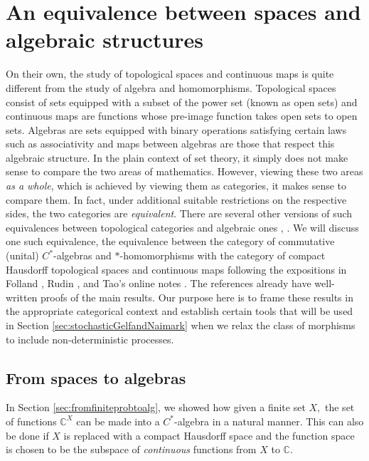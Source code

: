 \documentclass[12pt]{article}
\theoremstyle{theorem}
\theoremstyle{definition}
\numberwithin{equation}{section}
\let\C=\Chi \let\W=\Omega
\newcommand{\<}{\langle}
\renewcommand{\>}{\rangle}
\def\C{{{\mathbb C}}}
\begin{document}
\section{An equivalence between spaces and algebraic structures}
\label{sec:GelfandNaimark}

On their own, the study of topological spaces and continuous maps
is quite different from the study of algebra and homomorphisms.
Topological spaces consist
of sets equipped with a subset of the power set (known as open sets) 
and continuous maps
are functions whose pre-image function takes open sets to open sets. 
Algebras are sets equipped with binary operations satisfying certain
laws such as associativity and maps between algebras are those 
that respect this algebraic structure. 
In the plain context of set theory, it simply does not make sense to compare
the two areas of mathematics. However, viewing these two areas 
\emph{as a whole}, which is achieved by viewing them as categories, 
it makes sense to compare them. 
In fact, under additional suitable restrictions on the respective sides, 
the two categories are \emph{equivalent}. 
There are several other versions of such equivalences between
topological categories and algebraic ones \cite{Ka41}, \cite{Ka51}. 
We will discuss one such equivalence, the equivalence
between the category of commutative (unital) $C^*$-algebras and $*$-homomorphisms
with the category of compact Hausdorff topological spaces and continuous
maps following the expositions in Folland  \cite{Fo94}, Rudin \cite{Ru91},
and Tao's online notes \cite{Ta09_245B11}.
The references already have well-written proofs of the main results.
Our purpose here is to frame these results in the appropriate
categorical context and establish certain tools that will be used in 
Section \ref{sec:stochasticGelfandNaimark} when we relax the class
of morphisms to include non-deterministic processes. 


\subsection{From spaces to algebras}
\label{sec:spacestoalgebras}

In Section \ref{sec:fromfiniteprobtoalg}, we showed how given a finite set $X,$
the set of functions $\C^{X}$ can be made into a $C^*$-algebra
in a natural manner. This can also be done if $X$ is replaced
with a compact Hausdorff space and the function space is chosen
to be the subspace of \emph{continuous} functions from $X$ to $\C.$ 
\end{document}
